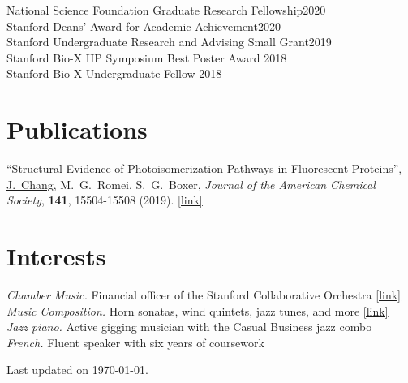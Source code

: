 \documentclass[margin,11pt]{res}
\begin{document}
\begin{resume}
National Science Foundation Graduate Research Fellowship\hfill 2020 \\
Stanford Deans' Award for Academic Achievement\hfill 2020 \\
Stanford Undergraduate Research and Advising Small Grant\hfill 2019 \\
Stanford Bio-X IIP Symposium Best Poster Award \hfill 2018 \\
Stanford Bio-X Undergraduate Fellow \hfill 2018

\section{Publications}

% 

\begin{changemargin}{0em}{3em}
    ``Structural Evidence of Photoisomerization Pathways in Fluorescent Proteins'',
    \underline{J.\ Chang}, M.\ G.\ Romei, S.\ G.\ Boxer,
    \textit{Journal of the American Chemical Society},
    \textbf{141},
    15504-15508
    (2019).
    \href{http://dx.doi.org/10.1021/jacs.9b08356}{[link]}
\end{changemargin}

\section{Interests}

\textit{Chamber Music.} Financial officer of the Stanford Collaborative Orchestra \href{https://scor.stanford.edu}{[link]} \\
\textit{Music Composition.} Horn sonatas, wind quintets, jazz tunes, and more \href{https://jeffjar.me/music.html}{[link]} \\
\textit{Jazz piano.} Active gigging musician with the Casual Business jazz combo \\
\textit{French.} Fluent speaker with six years of coursework

\end{resume}

\vfill\hfill{\scriptsize Last updated on \today.}
\end{document}
